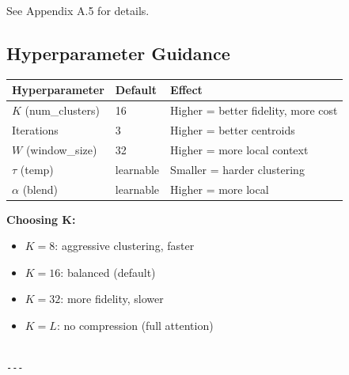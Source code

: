 See Appendix A.5 for details.

\subsection{Hyperparameter Guidance}

\begin{table}[H]
\centering
\small
\begin{tabular}{lll}
\toprule
\textbf{Hyperparameter} & \textbf{Default} & \textbf{Effect} \\
\midrule
$K$ (num\_clusters) & 16 & Higher = better fidelity, more cost \\
Iterations & 3 & Higher = better centroids \\
$W$ (window\_size) & 32 & Higher = more local context \\
$\tau$ (temp) & learnable & Smaller = harder clustering \\
$\alpha$ (blend) & learnable & Higher = more local \\
\bottomrule
\end{tabular}
\end{table}

\textbf{Choosing K:}

\begin{itemize}
\item $K = 8$: aggressive clustering, faster
\item $K = 16$: balanced (default)
\item $K = 32$: more fidelity, slower
\item $K = L$: no compression (full attention)
\end{itemize}
\begin{lstlisting}

---
\end{lstlisting}